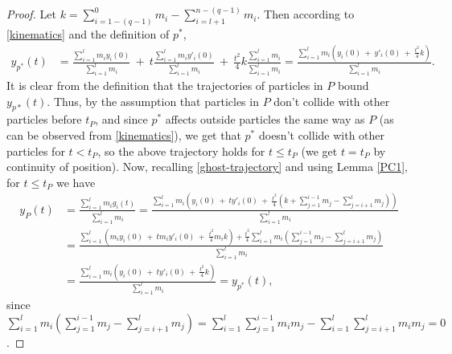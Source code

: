 \documentclass[11pt]{article}
\numberwithin{equation}{section}
\begin{document}
    \begin{proof}
        Let $k=\sum_{i=1-(q-1)}^{0}m_i-\sum_{i=l+1}^{n-(q-1)}m_i$. Then according to \eqref{kinematics} and the definition of $p^*$, 
        \begin{align*}
            y_{p^*}(t) 
            &=\frac{\sum_{i=1}^{l}m_iy_i(0)}{\sum_{i=1}^{l}m_i}\ +\ t\frac{\sum_{i=1}^{l}m_iy'_i(0)}{\sum_{i=1}^{l}m_i}\ +\ \frac{t^2}{4}k\frac{\sum_{i=1}^{l}m_i}{\sum_{i=1}^{l}m_i} 
            =\frac{\sum_{i=1}^{l}m_i\left(y_i(0)\ +\ y'_i(0)\ +\ \frac{t^2}{4}k\right)}{\sum_{i=1}^{l}m_i}.
        \end{align*}
        It is clear from the definition that the trajectories of particles in $P$ bound $y_{p*}(t)$. 
        Thus, by the assumption that particles in $P$ don't collide with other particles before $t_P$, and since $p^*$ affects outside particles the same way as $P$ (as can be observed from \eqref{kinematics}), we get that $p^*$ doesn't collide with other particles for $t<t_P$, so the above trajectory holds for $t \le t_P$ (we get $t=t_P$ by continuity of position). 
        Now, recalling \eqref{ghost-trajectory} and using Lemma \ref{PC1}, for $t \le t_P$ we have
        \begin{align*}
            y_P(t) &= \frac{\sum_{i=1}^{l}m_ig_i(t)}{\sum_{i=1}^{l}m_i} %
            =\frac{\sum_{i=1}^{l}m_i\left( y_i(0)\ +\ ty'_i(0)\ +\ \frac{t^2}{4}\left( k + \sum_{j=1}^{i-1}m_j-\sum_{j=i+1}^{l}m_j\right)\right)}{\sum_{i=1}^{l}m_i} \\[1em]
            &=\frac{\sum_{i=1}^{l}\left(m_iy_i(0)\ +\ tm_iy'_i(0)\ +\ \frac{t^2}{4}m_i k\right)+\frac{t^2}{4}\sum_{i=1}^{l}m_i\left(\sum_{j=1}^{i-1}m_j-\sum_{j=i+1}^{l}m_j\right)}{\sum_{i=1}^{l}m_i} \\[1em]
            &=\frac{\sum_{i=1}^{l}m_i\left(y_i(0)\ +\ ty'_i(0)\ +\ \frac{t^2}{4}k\right)}{\sum_{i=1}^{l}m_i} = y_{p^*}(t), 
        \end{align*}
        since $\sum_{i=1}^{l}m_i\left(\sum_{j=1}^{i-1}m_j-\sum_{j=i+1}^{l}m_j\right) = \sum_{i=1}^{l}\sum_{j=1}^{i-1}m_im_j-\sum_{i=1}^{l}\sum_{j=i+1}^{l}m_im_j=0$.
    \end{proof}
\end{document}
